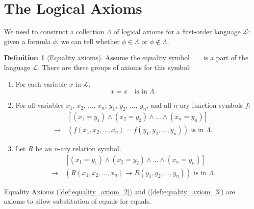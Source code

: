 \documentclass[11pt,letterpaper]{book}
\theoremstyle{definition}
\newtheorem{definition}{Definition}[section]
\begin{document}
\section{The Logical Axioms}\label{sec:2_3_logical_axioms}


We need to construct a collection $\Lambda$ of logical axioms for a
first-order language $\mathcal{L}$: given a formula $\phi$, we can tell
whether $\phi \in \Lambda$ or $\phi \notin \Lambda $.


\begin{definition}[Equality axioms] Assume the equality symbol $=$ is a
part of the language $\mathcal{L}$. There are three groups of axioms for
this symbol:
\begin{enumerate}
\item{For each variable $x$ in $\mathcal{L}$,}
\begin{equation}\label{def:equality_axiom_1}
x=x \quad \text{is in } \Lambda. \tag{E1}
\end{equation}
\item{For all variables $x_1$, $x_2$, $\ldots$, $x_n$; $y_1$, $y_2$,
$\ldots$, $y_n$, and all $n$-ary function symbols $f$:}
\begin{equation}\label{def:equality_axiom_2}
\begin{aligned}
& [(x_1 = y_1) \land (x_2=y_2) \land \ldots \land (x_n=y_n) ] \\
\rightarrow\, & ( f(x_1, x_2, \ldots, x_n) = f(y_1, y_2, \ldots, y_n) )
\text{ is in } \Lambda.
\end{aligned}\tag{E2}
\end{equation}
\item{Let $R$ be an $n$-ary relation symbol.}
\begin{equation}\label{def:equality_axiom_3}
\begin{aligned}
& [(x_1 = y_1) \land (x_2=y_2) \land \ldots \land (x_n=y_n) ] \\
\rightarrow\, & ( R(x_1, x_2, \ldots, x_n) \rightarrow R(y_1, y_2,
\ldots, y_n) ) \text{ is in } \Lambda.
\end{aligned}\tag{E3}
\end{equation}
\end{enumerate}

\end{definition}


Equality Axioms (\ref{def:equality_axiom_2}) and
(\ref{def:equality_axiom_3}) are axioms to allow substitution of equals
for equals.
\end{document}
